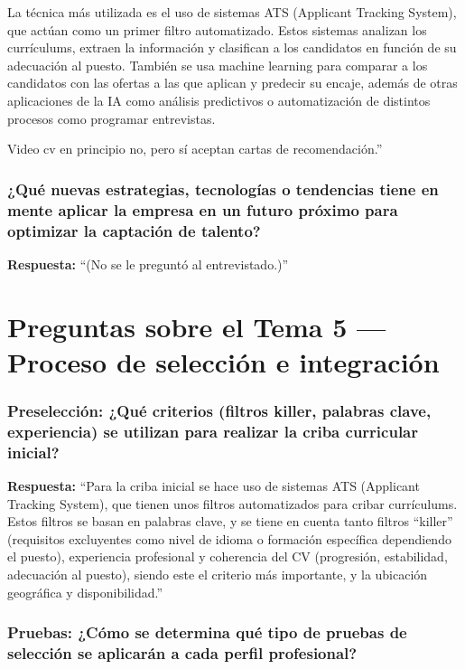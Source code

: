 La técnica más utilizada es el uso de sistemas ATS (Applicant Tracking System), que actúan como un primer filtro automatizado. Estos sistemas analizan los currículums, extraen la información y clasifican a los candidatos en función de su adecuación al puesto. También se usa machine learning para comparar a los candidatos con las ofertas a las que aplican y predecir su encaje, además de otras aplicaciones de la IA como análisis predictivos o automatización de distintos procesos como programar entrevistas.

Video cv en principio no, pero sí aceptan cartas de recomendación.''

\subsubsection*{¿Qué nuevas estrategias, tecnologías o tendencias tiene en mente aplicar la empresa en un futuro próximo para optimizar la captación de talento?}

\textbf{Respuesta:}\newline
``(No se le preguntó al entrevistado.)''

\section{Preguntas sobre el Tema 5 — Proceso de selección e integración}

\subsubsection*{Preselección: ¿Qué criterios (filtros killer, palabras clave, experiencia) se utilizan para realizar la criba curricular inicial?}

\textbf{Respuesta:}\newline
``Para la criba inicial se hace uso de sistemas ATS (Applicant Tracking System), que tienen unos filtros automatizados para cribar currículums. Estos filtros se basan en palabras clave, y se tiene en cuenta tanto filtros ``killer'' (requisitos excluyentes como nivel de idioma o formación específica dependiendo el puesto), experiencia profesional y coherencia del CV (progresión, estabilidad, adecuación al puesto), siendo este el criterio más importante, y la ubicación geográfica y disponibilidad.''

\subsubsection*{Pruebas: ¿Cómo se determina qué tipo de pruebas de selección se aplicarán a cada perfil profesional?}

